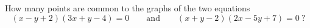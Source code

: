 How many points are common to the graphs of the two equations
\[
(x-y+2)(3x+y-4)=0\qquad\text{and}\qquad(x+y-2)(2x-5y+7)=0\ ?
\]
